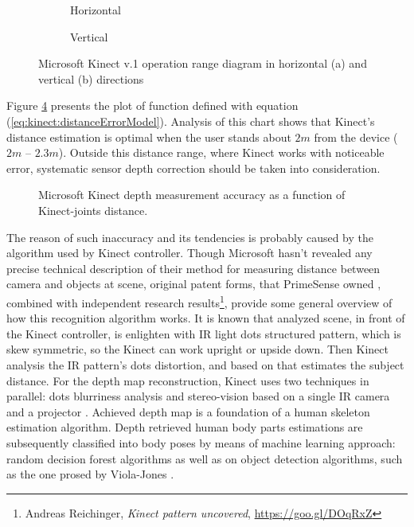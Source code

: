 \documentclass[sensors,article,submit,moreauthors,pdftex,10pt,a4paper]{mdpi}
\begin{document}
\begin{figure}[H]
	\centering
	\begin{subfigure}[b]{0.4\textwidth}
		\centering
		
		\caption{Horizontal}
		\label{fig:kinect:range:a}
	\end{subfigure} \hfill
	\begin{subfigure}[b]{0.4\textwidth}
		\centering
		
		\caption{Vertical}
		\label{fig:kinect:range:b}
	\end{subfigure} \hfill
	\begin{subfigure}[p]{0.18\textwidth}
		\hfill
		               
	\end{subfigure}
	\caption{Microsoft Kinect v.1 operation range diagram in horizontal (a) and vertical (b) directions}
	\label{fig:kinect:range}
\end{figure}   

Figure \ref{fig:kinect:distanceAccuracy} presents the plot of function defined with equation (\ref{eq:kinect:distanceErrorModel}). Analysis of this chart shows that Kinect’s distance estimation is optimal when the user stands about $2m$ from the device ($2m$ – $2.3m$). Outside this distance range, where Kinect works with noticeable error, systematic sensor depth correction should be taken into consideration.

\begin{figure}[H]
	\centering	
											
	\caption{Microsoft Kinect depth measurement accuracy as a function of Kinect-joints distance.}
	\label{fig:kinect:distanceAccuracy}
\end{figure}

The reason of such inaccuracy and its tendencies is probably caused by the algorithm used by Kinect controller. Though Microsoft hasn’t revealed any precise technical description of their method for measuring distance between camera and objects at scene, original patent forms, that PrimeSense owned \cite{patent:20100118123,patent:20100020078,patent:20080106746}, combined with independent research results\footnote{Andreas Reichinger, \textit{Kinect pattern uncovered}, \url{https://goo.gl/DOqRxZ}}, provide some general overview of how this recognition algorithm works. It is known that analyzed scene, in front of the Kinect controller, is enlighten with IR light dots structured pattern, which is skew symmetric, so the Kinect can work upright or upside down. Then Kinect analysis the IR pattern’s dots distortion, and based on that estimates the subject distance. For the depth map reconstruction, Kinect uses two techniques in parallel: dots blurriness analysis \cite{Fofi2004} and stereo-vision based on a single IR camera and a projector \cite{Rzeszotarski2006}. Achieved depth map is a foundation of a human skeleton estimation algorithm. Depth retrieved human body parts estimations are subsequently classified into body poses by means of machine learning approach: random decision forest algorithms as well as on object detection algorithms, such as the one prosed by Viola-Jones \cite{Shotton2008, Shotton2011a}. 
\end{document}
